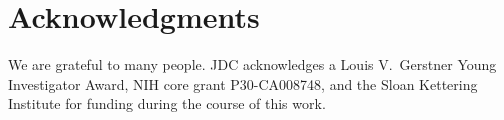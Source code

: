 \documentclass[aps,pre,twocolumn,nofootinbib,superscriptaddress,linenumbers,11point]{revtex4-1}
\begin{document}

\section*{Acknowledgments}

We are grateful to many people.
JDC acknowledges a Louis V.~Gerstner Young Investigator Award, NIH core grant P30-CA008748, and the Sloan Kettering Institute for funding during the course of this work.


 

\end{document}
